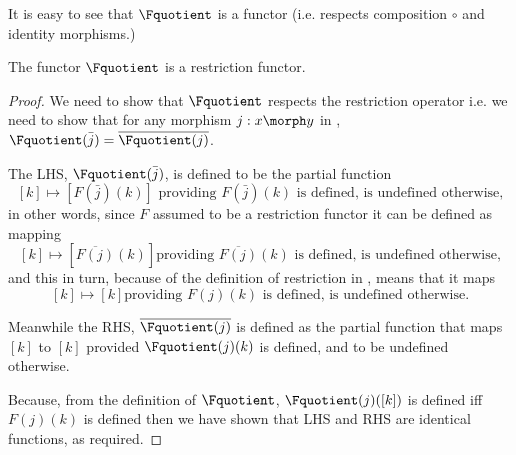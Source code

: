 It is easy to see that $\Fquotient$ is a functor (i.e. respects composition $\circ$ and identity morphisms.)

\begin{lemma}
The functor $\Fquotient$ is a restriction functor.
\end{lemma}
\begin{proof}
We need to show that  $\Fquotient$ respects the restriction operator
i.e. we need to show that for any morphism $j:x \morph y$ in \catcw, $\Fquotient(\bar{j})= \overline{\Fquotient(j)}$.

The LHS, $\Fquotient(\bar{j})$, is defined to  be the partial function
$$ [k] \mapsto [F(\bar{j})(k)] \mbox{ providing $F(\bar{j})(k)$ is defined, is undefined otherwise,}$$
in other words, since  $F$ assumed to be a restriction functor it can be defined as mapping
$$ [k] \mapsto [\overline{F(j)}(k)] \mbox{providing $\overline{F(j)}(k)$ is defined, is undefined otherwise,}$$
and this in turn, because of the definition of restriction in \Par, means that it maps
$$ [k] \mapsto [k] \mbox{providing $F(j)(k)$ is defined, is undefined otherwise.}$$

Meanwhile the RHS, $\overline{\Fquotient(j)}$  is defined as the partial function that 
maps $[k]$  to $[k]$  provided  $\Fquotient(j)(k)$ is defined, and to be undefined otherwise.

Because,
from the definition of $\Fquotient$, $\Fquotient(j)([k])$ is defined iff $F(j)(k)$ is defined then
we have shown that LHS and RHS are identical functions, as required.
\end{proof}


